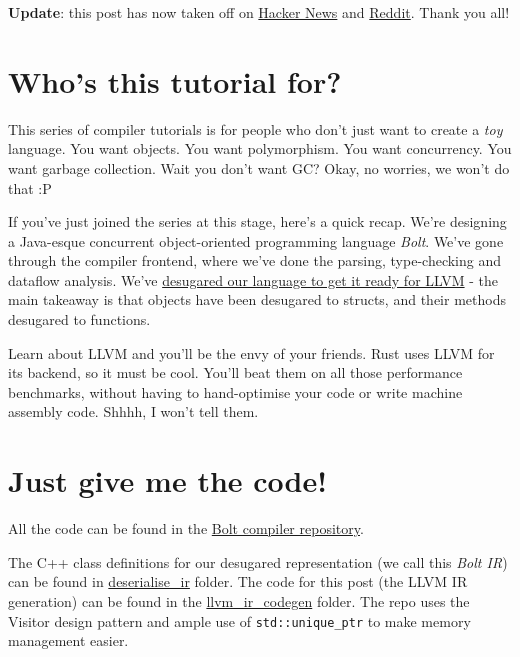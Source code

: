 \textbf{Update}: this post has now taken off on
\href{https://news.ycombinator.com/item?id=25539797}{Hacker News} and
\href{https://www.reddit.com/r/programming/comments/kjjijf/a_complete_guide_to_llvm_for_programming_language/}{Reddit}.
Thank you all!

\hypertarget{whos-this-tutorial-for}{%
\section{\texorpdfstring{\protect\hyperlink{whos-this-tutorial-for}{}Who's
this tutorial
for?}{Who's this tutorial for?}}\label{whos-this-tutorial-for}}

This series of compiler tutorials is for people who don't just want to
create a \emph{toy} language. You want objects. You want polymorphism.
You want concurrency. You want garbage collection. Wait you don't want
GC? Okay, no worries, we won't do that :P

If you've just joined the series at this stage, here's a quick recap.
We're designing a Java-esque concurrent object-oriented programming
language \emph{Bolt}. We've gone through the compiler frontend, where
we've done the parsing, type-checking and dataflow analysis. We've
\href{https://mukulrathi.com/create-your-own-programming-language/lower-language-constructs-to-llvm/}{desugared
our language to get it ready for LLVM} - the main takeaway is that
objects have been desugared to structs, and their methods desugared to
functions.

Learn about LLVM and you'll be the envy of your friends. Rust uses LLVM
for its backend, so it must be cool. You'll beat them on all those
performance benchmarks, without having to hand-optimise your code or
write machine assembly code. Shhhh, I won't tell them.

\hypertarget{just-give-me-the-code}{%
\section{\texorpdfstring{\protect\hyperlink{just-give-me-the-code}{}Just
give me the
code!}{Just give me the code!}}\label{just-give-me-the-code}}

All the code can be found in the
\href{https://github.com/mukul-rathi/bolt}{Bolt compiler repository}.

The C++ class definitions for our desugared representation (we call this
\emph{Bolt IR}) can be found in
\href{https://github.com/mukul-rathi/bolt/tree/master/src/llvm-backend/deserialise_ir}{deserialise\_ir}
folder. The code for this post (the LLVM IR generation) can be found in
the
\href{https://github.com/mukul-rathi/bolt/tree/master/src/llvm-backend/llvm_ir_codegen}{llvm\_ir\_codegen}
folder. The repo uses the Visitor design pattern and ample use of
\texttt{std::unique\_ptr} to make memory management easier.


